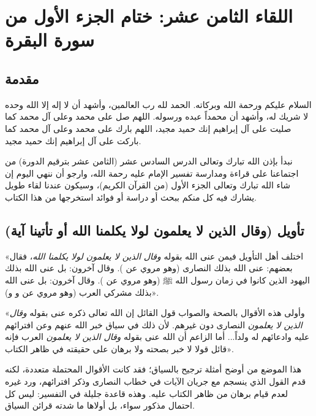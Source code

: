 \chapter{اللقاء الثامن عشر: ختام الجزء الأول من سورة البقرة}

\section{مقدمة}
السلام عليكم ورحمة الله وبركاته. الحمد لله رب العالمين، وأشهد أن لا إله إلا الله وحده لا شريك له، وأشهد أن محمداً عبده ورسوله. اللهم صل على محمد وعلى آل محمد كما صليت على آل إبراهيم إنك حميد مجيد، اللهم بارك على محمد وعلى آل محمد كما باركت على آل إبراهيم إنك حميد مجيد.

نبدأ بإذن الله تبارك وتعالى الدرس السادس عشر (الثامن عشر بترقيم الدورة) من اجتماعنا على قراءة ومدارسة تفسير الإمام  عليه رحمة الله، وارجو أن ننهي اليوم إن شاء الله تبارك وتعالى الجزء الأول (من القرآن الكريم)، وسيكون عندنا لقاء طويل يشارك فيه كل منكم ببحث أو دراسة أو فوائد استخرجها من هذا الكتاب.

\separator

\section{تأويل (وقال الذين لا يعلمون لولا يكلمنا الله أو تأتينا آية)}
 «اختلف أهل التأويل فيمن عنى الله بقوله \textit{وقال الذين لا يعلمون لولا يكلمنا الله}، فقال بعضهم: عنى الله بذلك النصارى (وهو مروي عن ). وقال آخرون: بل عنى الله بذلك اليهود الذين كانوا في زمان رسول الله ﷺ (وهو مروي عن ). وقال آخرون: بل عنى الله بذلك مشركي العرب (وهو مروي عن  و و)».

 «وأولى هذه الأقوال بالصحة والصواب قول القائل إن الله تعالى ذكره عنى بقوله \textit{وقال الذين لا يعلمون} النصارى دون غيرهم. لأن ذلك في سياق خبر الله عنهم وعن افترائهم عليه وادعائهم له ولداً... أما الزاعم أن الله عنى بقوله \textit{وقال الذين لا يعلمون} العرب فإنه قائل قولا لا خبر بصحته ولا برهان على حقيقته في ظاهر الكتاب».

\begin{fawaid}
هذا الموضع من أوضح أمثلة ترجيح  بالسياق؛ فقد كانت الأقوال المحتملة متعددة، لكنه قدم القول الذي ينسجم مع جريان الآيات في خطاب النصارى وذكر افترائهم، ورد غيره لعدم قيام برهان من ظاهر الكتاب عليه. وهذه قاعدة جليلة في التفسير: ليس كل احتمال مذكور سواء، بل أولاها ما شدته قرائن السياق.
\end{fawaid}

